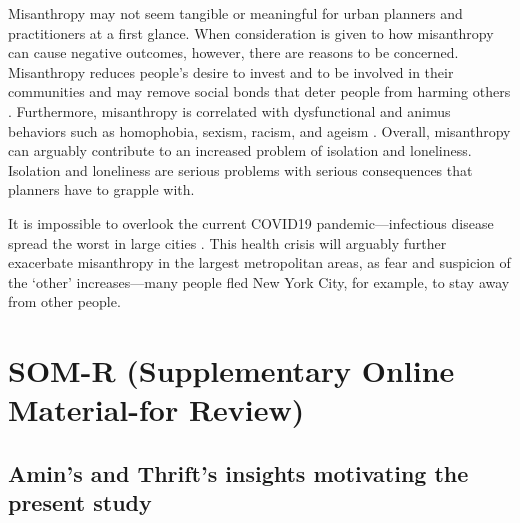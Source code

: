 \documentclass[11pt, letterpaper]{article}
\begin{document}
\begin{spacing}{1.4}
Misanthropy may not seem tangible or meaningful for urban planners and practitioners at a first
glance.  When consideration is given to how misanthropy can cause
negative outcomes, however, there are reasons to be concerned. Misanthropy reduces people's desire to invest and to be involved in their communities and may remove social bonds that deter people from harming others
 \citep{weaver2006,hirschi1993,fafchamps2006,walters2013}. Furthermore, misanthropy is correlated with dysfunctional and animus behaviors such as
 homophobia, sexism, racism, and ageism \citep{cattacin2006}. 
 Overall, misanthropy can arguably contribute to an increased problem of
 isolation and loneliness. Isolation and loneliness are serious problems with
 serious consequences that planners have to grapple with.
 
It is impossible to overlook the current COVID19 pandemic---infectious disease
spread the worst in large cities \citep{bettencourt10}. This health crisis will arguably further exacerbate misanthropy in the largest metropolitan areas, as fear and suspicion of the `other' increases---many people fled New York City, for example, to stay  away from other people. 







\clearpage

\section*{\LARGE SOM-R (Supplementary Online Material-for Review)}

\subsection{Amin's and Thrift's insights motivating the present study}


\end{spacing}
\end{document}
